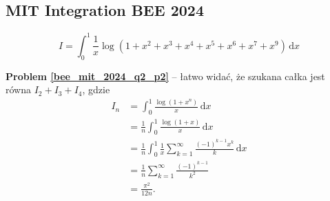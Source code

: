 %

\subsection{MIT Integration BEE 2024}

\begin{problem_with_solution}
    \label{bee_mit_2024_q2_p2}%
    \begin{equation}
        I = \int_0^1 \frac 1 x \log (1 + x^2 + x^3 + x^4 + x^5 + x^6 + x^7 + x^9) \,\mathrm{d}x
    \end{equation}
\end{problem_with_solution}

\textbf{Problem \ref{bee_mit_2024_q2_p2}} -- łatwo widać, że szukana całka jest równa $I_2 + I_3 + I_4$, gdzie
\begin{align}
    I_n & = \int_0^1 \frac {\log (1 + x^n)}{x} \,\mathrm{d}x \\
        & = \frac 1 n \int_0^1 \frac {\log (1 + x)}{x} \,\mathrm{d}x \\
        & = \frac 1 n \int_0^1 \frac 1 x \sum_{k=1}^\infty \frac{(-1)^{k-1}x^k}{k} \,\mathrm{d}x \\
        & = \frac 1 n \sum_{k=1}^\infty \frac{(-1)^{k-1}}{k^2} \\
        & = \frac {\pi^2}{12n}.
\end{align}

%